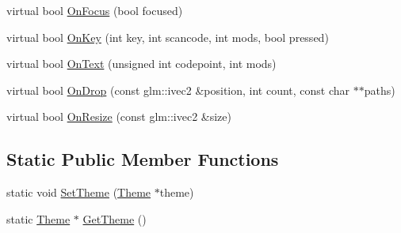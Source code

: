 \begin{DoxyCompactItemize}
virtual bool \mbox{\hyperlink{classec__gui_1_1_widget_ad8c4e0841214f66501a0cefc4f6e863e}{On\+Focus}} (bool focused)
\item 
virtual bool \mbox{\hyperlink{classec__gui_1_1_widget_adcbf1cb953e1cb480635befc379c8e62}{On\+Key}} (int key, int scancode, int mods, bool pressed)
\item 
virtual bool \mbox{\hyperlink{classec__gui_1_1_widget_a99980fcd7af47e9f9d29c85a404729f6}{On\+Text}} (unsigned int codepoint, int mods)
\item 
virtual bool \mbox{\hyperlink{classec__gui_1_1_widget_a2b053e3f775081317f2bae8600efcdea}{On\+Drop}} (const glm\+::ivec2 \&position, int count, const char $\ast$$\ast$paths)
\item 
virtual bool \mbox{\hyperlink{classec__gui_1_1_widget_af352c24c35835706de550ee3b9cfbf91}{On\+Resize}} (const glm\+::ivec2 \&size)
\end{DoxyCompactItemize}
\subsection*{Static Public Member Functions}
\begin{DoxyCompactItemize}
\item 
static void \mbox{\hyperlink{classec__gui_1_1_widget_ac4365a0616af1d467f7afdf2c1ce00b8}{Set\+Theme}} (\mbox{\hyperlink{classec__gui_1_1_theme}{Theme}} $\ast$theme)
\item 
static \mbox{\hyperlink{classec__gui_1_1_theme}{Theme}} $\ast$ \mbox{\hyperlink{classec__gui_1_1_widget_a484b3e00467d9dd2ccf222ec91643c51}{Get\+Theme}} ()
\end{DoxyCompactItemize}
